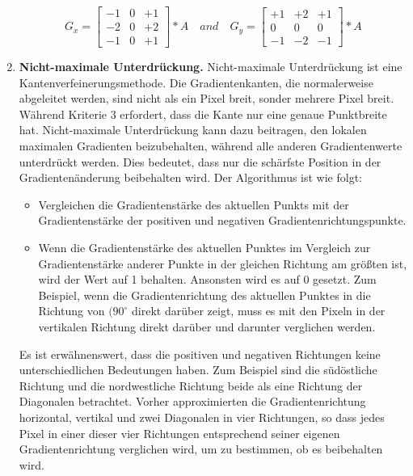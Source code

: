\begin{enumerate}
\begin{equation}
G_x = \begin{bmatrix}
-1 &0 &+1 \\
-2 &0 &+2 \\
-1 &0 &+1
\end{bmatrix} * A \quad and \quad G_y = \begin{bmatrix}
+1 &+2 &+1 \\
0 &0 &0 \\
-1 &-2 &-1
\end{bmatrix} * A
\end{equation}
	
	\item \textbf{Nicht-maximale Unterdrückung.} Nicht-maximale Unterdrückung ist eine Kantenverfeinerungsmethode. Die Gradientenkanten, die normalerweise abgeleitet werden, sind nicht als ein Pixel breit, sonder mehrere Pixel breit. Während Kriterie 3 erfordert, dass die Kante nur eine genaue Punktbreite hat. Nicht-maximale Unterdrückung kann dazu beitragen, den lokalen maximalen Gradienten beizubehalten, während alle anderen Gradientenwerte unterdrückt werden. Dies bedeutet, dass nur die schärfste Position in der Gradientenänderung beibehalten wird. Der Algorithmus ist wie folgt:
	\begin{itemize}
	\item Vergleichen die Gradientenstärke des aktuellen Punkts mit der Gradientenstärke der positiven und negativen Gradientenrichtungspunkte.
	\item Wenn die Gradientenstärke des aktuellen Punktes im Vergleich zur Gradientenstärke anderer Punkte in der gleichen Richtung am größten ist, wird der Wert auf 1 behalten. Ansonsten wird es auf 0 gesetzt. Zum Beispiel, wenn die Gradientenrichtung des aktuellen Punktes in die Richtung von $(90^{\circ}$ direkt darüber zeigt, muss es mit den Pixeln in der vertikalen Richtung direkt darüber und darunter verglichen werden.
	\end{itemize}
	
	Es ist erwähnenswert, dass die positiven und negativen Richtungen keine unterschiedlichen Bedeutungen haben. Zum Beispiel sind die südöstliche Richtung und die nordwestliche Richtung beide als eine Richtung der Diagonalen betrachtet. Vorher approximierten die Gradientenrichtung horizontal, vertikal und zwei Diagonalen in vier Richtungen, so dass jedes Pixel in einer dieser vier Richtungen entsprechend seiner eigenen Gradientenrichtung verglichen wird, um zu bestimmen, ob es beibehalten wird. 
	

\end{enumerate}
